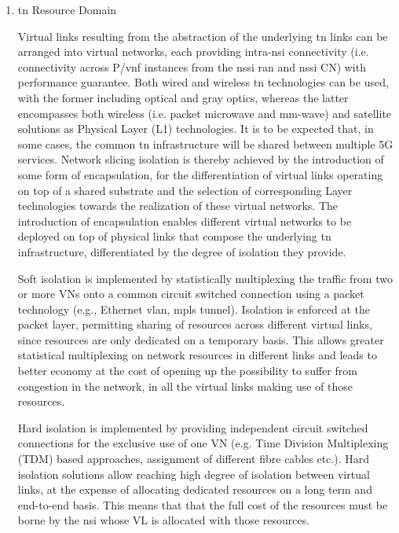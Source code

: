\begin{enumerate}
        \item{\acrfull{tn} Resource Domain}
        
        Virtual links resulting from the abstraction of the underlying \acrshort{tn} links can be arranged into virtual networks, each providing intra-\acrshort{nsi} connectivity (i.e. connectivity across P/\acrshort{vnf} instances from the \acrshort{nssi} \acrshort{ran} and \acrshort{nssi} CN) with performance guarantee. Both wired and wireless \acrshort{tn} technologies can be used, with the former including optical and gray optics, whereas the latter encompasses both wireless (i.e. packet microwave and mm-wave) and satellite solutions as Physical Layer (L1) technologies. 
        It is to be expected that, in some cases, the common \acrshort{tn} infrastructure will be shared between multiple 5G services. Network slicing isolation is thereby achieved by the introduction of some form of encapsulation, for the differentiation of virtual links operating on top of a shared substrate and the selection of corresponding Layer technologies towards the realization of these virtual networks. The introduction of encapsulation enables different virtual networks to be deployed on top of physical links that compose the underlying \acrshort{tn} infrastructure, differentiated by the degree of isolation they provide.
        
        Soft isolation is implemented by statistically multiplexing the traffic from two or more VNs onto a common circuit switched connection using a packet technology (e.g., Ethernet \acrfull{vlan}, \acrfull{mpls} tunnel). Isolation is enforced at the packet layer, permitting sharing of resources across different virtual links, since resources are only dedicated on a temporary basis. This allows greater statistical multiplexing on network resources in different links and leads to better economy at the cost of opening up the possibility to suffer from congestion in the network, in all the virtual links making use of those resources.
        
        Hard isolation is implemented by providing independent circuit switched connections for the exclusive use of one VN (e.g. Time Division Multiplexing (TDM) based approaches, assignment of different fibre cables etc.). Hard isolation solutions allow reaching high degree of isolation between virtual links, at the expense of allocating dedicated resources on a long term and end-to-end basis. This means that that the full cost of the resources must be borne by the \acrshort{nsi} whose VL is allocated with those resources.   
\end{enumerate}
    
